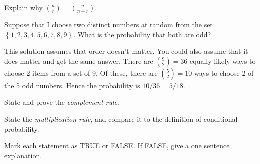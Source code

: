 \documentclass[addpoints,12pt]{exam}
\begin{document}
\begin{questions}

\question Explain why $\displaystyle{n \choose r} = {n \choose n-r}$.


  \question Suppose that I choose two distinct numbers at random from the set $\left\{ 1, 2, 3, 4, 5, 6, 7, 8, 9 \right\}$. What is the probability that both are odd?
  \begin{solution}
    This solution assumes that order doesn't matter.
    You could also assume that it does matter and get the same answer.
    There are $\displaystyle {9 \choose 2} = 36$ equally likely ways to choose 2 items from a set of 9. Of these, there are $\displaystyle {5 \choose 2} = 10$ ways to choose 2 of the 5 odd numbers.
    Hence the probability is $10/36 = 5/18$.
  \end{solution}


\question State and prove the \emph{complement rule}.

\question State the \emph{multiplication rule}, and compare it to the definition of conditional probability.

\question Mark each statement as TRUE or FALSE. If FALSE, give a one sentence explanation.
\end{questions}
\end{document}
